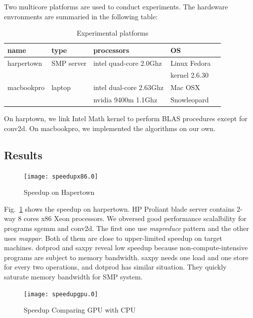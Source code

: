 \documentclass[10pt, conference, compsocconf]{IEEEtran}
\begin{document}
Two multicore platforms are used to conduct experiments. The hardsware
envronments are summaried in the following table:

\begin{table}[hb]
\caption{Experimental platforms}\label{tbl:mach}
\begin{center}
\begin{tabular}{|l|l|l|l|r|}
\hline
\textbf{name}&\textbf{type}&\textbf{processors}&\textbf{OS}\\
\hline
harpertown&SMP server&intel quad-core  2.0Ghz&Linux Fedora\\
                  &                &
                  & kernel 2.6.30\\
\hline
macbookpro&laptop &intel dual-core  2.63Ghz&Mac OSX\\
                     &           &nvidia 9400m 1.1Ghz     & Snowleopard\\
\hline
\end{tabular} 
\end{center}
\end{table}
On harptown, we link Intel Math kernel to perform BLAS procedures
except for conv2d. On macbookpro, we implemented the algorithms on our own.
\subsection{Results}

\begin{figure}
\texttt{[image: speedupx86.0]}
\caption{Speedup on Hapertown}\label{fig:spdx86}
\end{figure}

Fig.~\ref{fig:spdx86} shows the speedup on harpertown. HP Proliant
blade server contains 2-way 8 cores x86 Xeon
processors. We obversed good performance scalalbility for programs
sgemm and conv2d. The first one use \emph{mapreduce} pattern and the
other uses \emph{mappar}.  Both of them are close to upper-limited
speedup on target machines.  dotprod and saxpy reveal low speedup
because non-compute-intensive programs are subject to memory bandwidth. saxpy needs one load and one 
store for every two operations, and dotprod has similar
situation. They quickly saturate memory bandwidth for SMP system. 

\begin{figure}
\texttt{[image: speedupgpu.0]}
\caption{Speedup Comparing GPU with CPU}\label{fig:spdgpu}
\end{figure}
\end{document}
